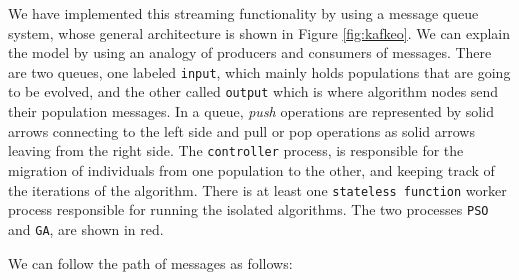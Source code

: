 \documentclass[runningheads]{llncs}
\begin{document}
We have implemented this streaming functionality by using a message queue
system, whose general architecture is shown in Figure \ref{fig:kafkeo}. We can explain
the model by using an analogy of producers and consumers of messages. There are
two queues, one labeled \texttt{input}, which mainly holds populations
that are going to be evolved, and the other called \texttt{output}
which is where algorithm nodes send their population messages. In a
queue, {\em push} operations are represented by solid arrows connecting to the
left side and pull or pop operations as solid arrows leaving from the right
side. The \texttt{controller} process, is responsible for the migration of
individuals from one population to the other, and keeping track of the
iterations of the algorithm. There is at least one \texttt{stateless function}
worker process responsible for running the isolated algorithms. The two
processes \texttt{PSO} and \texttt{GA}, are shown in red.

We can follow the path of messages as follows:
\end{document}
